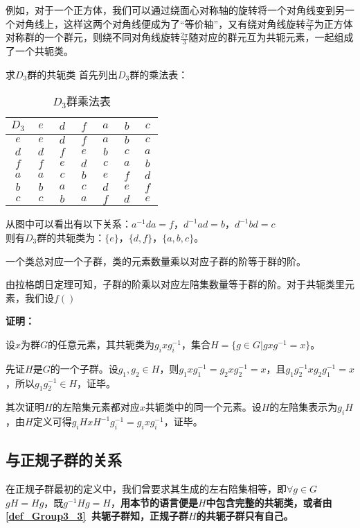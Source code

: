 例如，对于一个正方体，我们可以通过绕面心对称轴的旋转将一个对角线变到另一个对角线上，这样这两个对角线便成为了“等价轴”，又有绕对角线旋转$\frac{2\pi}{3}$为正方体对称群的一个群元，则绕不同对角线旋转$\frac{2\pi}{3}$随对应的群元互为共轭元素，一起组成了一个共轭类。

\begin{example}{求$D_3$群的共轭类}
首先列出$D_3$群的乘法表：
\begin{table}[ht]
\centering
\caption{$D_3$群乘法表}\label{tab_gpcon_1}
\begin{tabular}{|c|c|c|c|c|c|c|}
\hline
        $D_3$ & $~e~$ & $~d~$ & $~f~$ & $~a~$ & $~b~$ & $~c~$ \\ \hline
        $e$ & $e$ & $d$ & $f$ & $a$ & $b$ & $c$ \\ \hline
        $d$ & $d$ & $f$ & $e$ & $b$ & $c$ & $a$ \\ \hline
        $f$ & $f$ & $e$ & $d$ & $c$ & $a$ & $b$ \\ \hline
        $a$ & $a$ & $c$ & $b$ & $e$ & $f$ & $d$ \\ \hline
        $b$ & $b$ & $a$ & $c$ & $d$ & $e$ & $f$ \\ \hline
        $c$ & $c$ & $b$ & $a$ & $f$ & $d$ & $e$ \\ \hline
\end{tabular}
\end{table}

从图中可以看出有以下关系：$a^{-1}da=f$，$d^{-1}ad=b$，$d^{-1}bd=c$\\
则有$D_3$群的共轭类为：$\{e\}$，$\{d,f\}$，$\{a,b,c\}$。
\end{example}
\begin{theorem}{}
一个类总对应一个子群，类的元素数量乘以对应子群的阶等于群的阶。
\end{theorem}
由拉格朗日定理可知，子群的阶乘以对应左陪集数量等于群的阶。对于共轭类里元素，我们设$f()$

\textbf{证明：}

设$x$为群$G$的任意元素，其共轭类为$g_ixg_i^{-1}$，集合$H=\{ g\in G|gxg^{-1}=x\}$。

先证$H$是$G$的一个子群。设$g_1,g_2\in H$，则$g_1xg_1^{-1}=g_2xg_2^{-1}=x$，且$g_1g_2^{-1}xg_2g_1^{-1}=x$，所以$g_1g_2^{-1}\in H$，证毕。

其次证明$H$的左陪集元素都对应$x$共轭类中的同一个元素。设$H$的左陪集表示为$g_iH$，由$H$定义可得$g_iHxH^{-1}g_i^{-1}=g_ixg_i^{-1}$，证毕。


\subsection{与正规子群的关系}
在正规子群最初的定义中，我们曾要求其生成的左右陪集相等，即$\forall g \in G$ \\
$gH=Hg$，既$g^{-1}Hg=H$，\textbf{用本节的语言便是$H$中包含完整的共轭类，或者由\autoref{def_Group3_3}~共轭子群知，正规子群$H$的共轭子群只有自己。}

